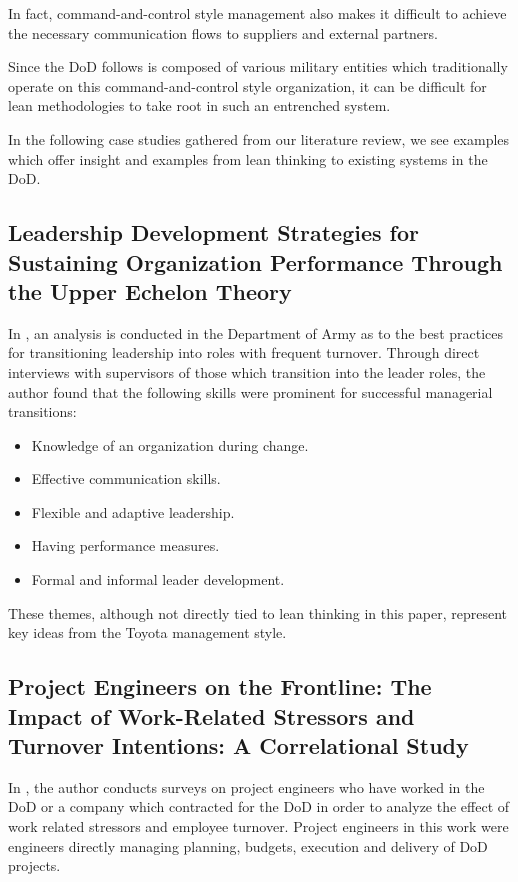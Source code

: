 \documentclass{article}
\begin{document}
		In fact, command-and-control style management also makes it difficult to achieve the necessary communication flows to suppliers and external partners.

		Since the DoD follows is composed of various military entities which traditionally operate on this command-and-control style organization, it can be difficult for lean methodologies to take root in such an entrenched system.

		In the following case studies gathered from our literature review, we see examples which offer insight and examples from lean thinking to existing systems in the DoD.


	\subsection{Leadership Development Strategies for Sustaining Organization Performance Through the Upper Echelon Theory \cite{McCants2024}}	

		In \cite{McCants2024}, an analysis is conducted in the Department of Army as to the best practices for transitioning leadership into roles with frequent turnover. 
		Through direct interviews with supervisors of those which transition into the leader roles, the author found that the following skills were prominent for successful managerial transitions:
		\begin{itemize}
			\item Knowledge of an organization during change.
			\item Effective communication skills.
			\item Flexible and adaptive leadership.
			\item Having performance measures.
			\item Formal and informal leader development.
		\end{itemize}

		These themes, although not directly tied to lean thinking in this paper, represent key ideas from the Toyota management style.




	\subsection{Project Engineers on the Frontline: The Impact of Work-Related Stressors and Turnover Intentions: A Correlational Study \cite{Turner2024}}

		In \cite{Turner2024}, the author conducts surveys on project engineers who have worked in the DoD or a company which contracted for the DoD in order to analyze the effect of work related stressors and employee turnover.
		Project engineers in this work were engineers directly managing planning, budgets, execution and delivery of DoD projects.
		
\end{document}
